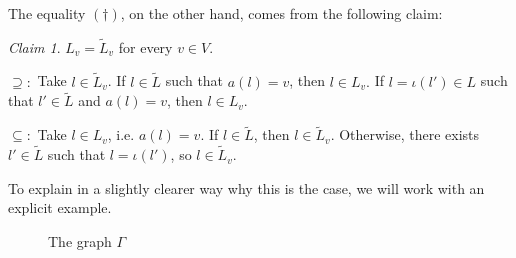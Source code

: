 \documentclass[a4paper,12 pt,titlepage,twoside]{book}
\theoremstyle{plain}
\theoremstyle{theorem}
\theoremstyle{definition}
\theoremstyle{remark}
\newtheorem*{claim*}{Claim}
\begin{document}
	The equality $(\dagger)$, on the other hand, comes from the following claim: \begin{claim*}
		$L_v = \tilde{L}_v$ for every $v \in V$.
	\end{claim*}
	$\supseteq: $ Take $l \in \tilde{L}_v$. If $l \in \tilde{L}$ such that $a(l) = v$, then $l \in L_v.$ If $l= \iota(l') \in L$ such that $l' \in \tilde{L}$ and $a(l) =v$, then $l \in L_v.$
	
	$\subseteq: $ Take $l \in L_v$, i.e. $a(l)=v.$ If $l \in \tilde{L}$, then $l \in \tilde{L}_v$. Otherwise, there exists $l' \in \tilde{L}$ such that $l=\iota(l')$, so $l \in \tilde{L}_v$.
	
	To explain in a slightly clearer way why this is the case, we will work with an explicit example. 
	\begin{center}
		\begin{figure}[h!]
			\centering
			\caption{The graph $\Gamma$}
			\label{fig: example flow}
		\end{figure}
	\end{center}
\end{document}
